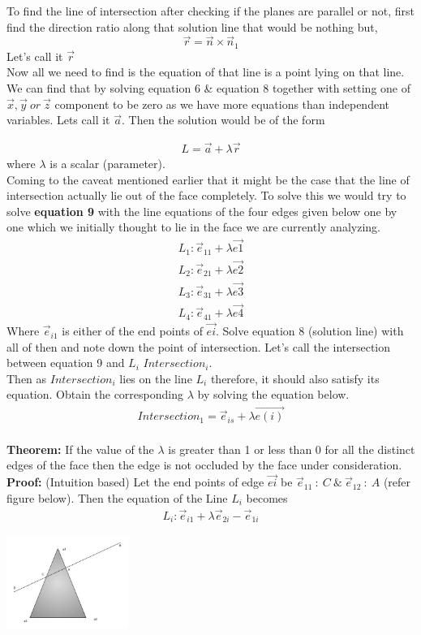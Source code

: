  To find the line of intersection after checking if the planes are parallel or not, first find the direction ratio along that solution line that would be nothing but, 
 $$ 
 		\vec{r} = \vec{n} \times \vec{n}_1
$$
Let's call it $\vec{r}$ \\
Now all we need to find is the equation of that line is  a point lying on that line. We can find that by solving equation 6 \& equation 8 together with setting one of $\vec{x}, \vec{y} \ or\ \vec{z}$ component to be zero as we have more equations than independent variables. Lets call it $\vec{a}$. Then the solution would be of the form

\begin{align}
L = \vec{a} + \lambda\vec{r}
\end{align}
where $\lambda $ is a scalar (parameter).
\\
Coming to the caveat mentioned earlier that it might be the case that the line of intersection  actually lie out of the face completely. To solve this we would try to solve \textbf{equation 9} with the line equations of the four edges given below one by one which we initially thought to lie in the face we are currently analyzing. 
\begin {align}
L_1 : \vec{e}_{11} + \lambda \vec{e1} \\
L_2 : \vec{e}_{21} + \lambda \vec{e2} \\
L_3 : \vec{e}_{31} + \lambda \vec{e3} \\
L_4 : \vec{e}_{41} + \lambda \vec{e4} 
\end {align}
Where $\vec{e}_{i1} $ is either of the end points of $\vec{ei}$. Solve equation 8 (solution line) with all of then and note down the point of intersection. Let's call the intersection between equation 9 and $L_i$ 
\: $Intersection _i$.
\\
Then as $Intersection_i$ lies on the line $L_i$ therefore, it should also satisfy its equation. Obtain the corresponding $\lambda$ by solving the equation below. 
\begin{align}
Intersection_1 = \vec{e}_{is} + \lambda \vec{e(i)}
\end{align}\\
\textbf{Theorem:} If the value of the $\lambda$ is greater than 1 or less than 0 for all the distinct edges of the face then the edge is not occluded by the face under consideration. 
\\
\textbf{Proof:} (Intuition based) Let the end points of edge $\vec{ei}$ be $\vec{e}_{11} \ : \ C \ \&   \ \vec{e}_{12} \ : \ A $ (refer figure below). Then the equation of the Line $L_i$ becomes 
\begin{align}
L_i : \vec{e}_{i1} + \lambda \vec{e}_{2i} - \vec{e}_{1i}
\end{align}
\begin{center}
\includegraphics[height = 3cm]{figx.png}
\end{center}

